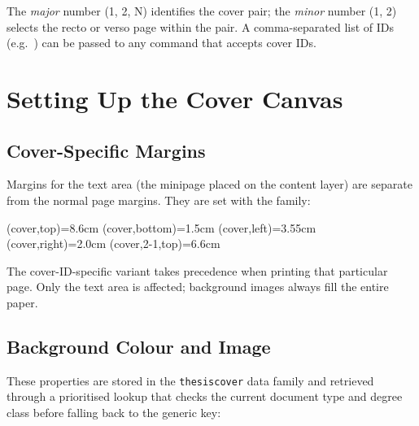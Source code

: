 The \emph{major} number (1, 2, N) identifies the cover pair; the \emph{minor}
number (1, 2) selects the recto or verso page within the pair.  A
comma-separated list of IDs (e.g.\ ) can be passed to any
command that accepts cover IDs.


\section{Setting Up the Cover Canvas}
\label{sec:covers_canvas}

\subsection{Cover-Specific Margins}
\label{sec:covers_margins}

Margins for the text area (the minipage placed on the content layer) are
separate from the normal page margins.  They are set with the
 family:

\begin{latexcode}
\SetMargin*(cover,top)={8.6cm}    %
\SetMargin*(cover,bottom)={1.5cm}
\SetMargin*(cover,left)={3.55cm}
\SetMargin*(cover,right)={2.0cm}
\SetMargin*(cover,2-1,top)={6.6cm} %
\end{latexcode}

The cover-ID-specific variant takes precedence when printing that particular
page.  Only the text area is affected; background images always fill the
entire paper.


\subsection{Background Colour and Image}
\label{sec:covers_bg}

These properties are stored in the \texttt{thesiscover} data family and
retrieved through a prioritised lookup that checks the current document type
and degree class before falling back to the generic key:

